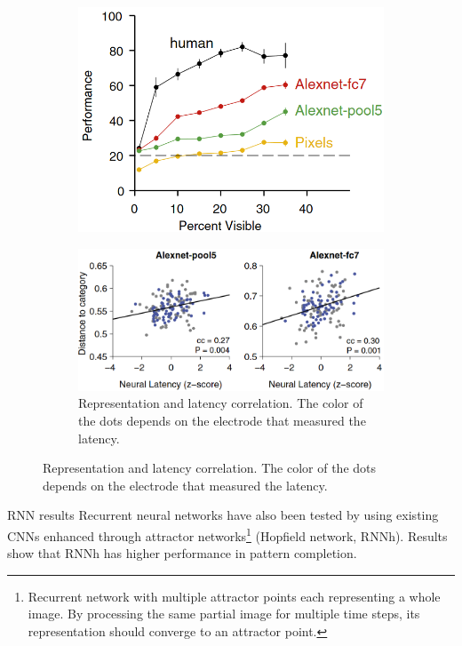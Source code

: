 \begin{casestudy}
\begin{descriptionlist}
            \begin{figure}[H]
                \centering
                \begin{subfigure}{0.33\linewidth}
                    \centering
                    \includegraphics[width=0.9\linewidth]{./img/pattern_completion4.png}
                \end{subfigure}
                \begin{subfigure}{0.65\linewidth}
                    \centering
                    \includegraphics[width=0.6\linewidth]{./img/pattern_completion5.png}
                    \caption{Representation and latency correlation. The color of the dots depends on the electrode that measured the latency.}
                \end{subfigure}
            \end{figure}

        \item[RNN results]
            Recurrent neural networks have also been tested by using existing CNNs enhanced through attractor networks\footnote{
                Recurrent network with multiple attractor points each representing a whole image. 
                By processing the same partial image for multiple time steps, its representation should converge to an attractor point.
            } (Hopfield network, RNNh).
            Results show that RNNh has higher performance in pattern completion.
        

\end{descriptionlist}
\end{casestudy}
